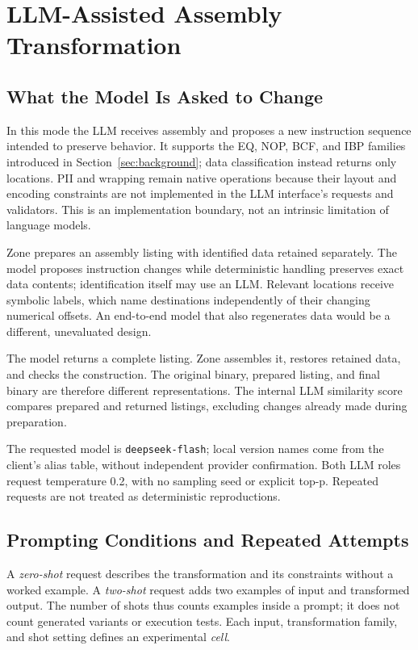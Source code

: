 \section{LLM-Assisted Assembly Transformation}\label{sec:llm}
\subsection{What the Model Is Asked to Change}
In this mode the LLM receives assembly and proposes a new instruction
sequence intended to preserve behavior. It supports the EQ, NOP, BCF,
and IBP families introduced in Section~\ref{sec:background}; data
classification instead returns only locations. PII and wrapping remain
native operations because their layout and encoding constraints are not
implemented in the LLM interface's requests and validators. This is an
implementation boundary, not an intrinsic limitation of language models.

Zone prepares an assembly listing with identified data retained separately.
The model proposes instruction changes while deterministic handling
preserves exact data contents; identification itself may use an LLM.
Relevant locations receive symbolic labels, which name destinations
independently of their changing numerical offsets. An end-to-end model
that also regenerates data would be a different, unevaluated design.

The model returns a complete listing. Zone assembles it, restores retained
data, and checks the construction. The original binary, prepared listing,
and final binary are therefore different representations. The internal
LLM similarity score compares prepared and returned listings, excluding
changes already made during preparation.

The requested model is \texttt{deepseek-flash}; local version names come
from the client's alias table, without independent provider confirmation.
Both LLM roles request temperature 0.2, with no sampling seed or explicit
top-p. Repeated requests are not treated as deterministic reproductions.

\subsection{Prompting Conditions and Repeated Attempts}
A \emph{zero-shot} request describes the transformation and its constraints
without a worked example. A \emph{two-shot} request adds two examples of
input and transformed output. The number of shots thus counts examples
inside a prompt; it does not count generated variants or execution tests.
Each input, transformation family, and shot setting defines an experimental
\emph{cell}.


